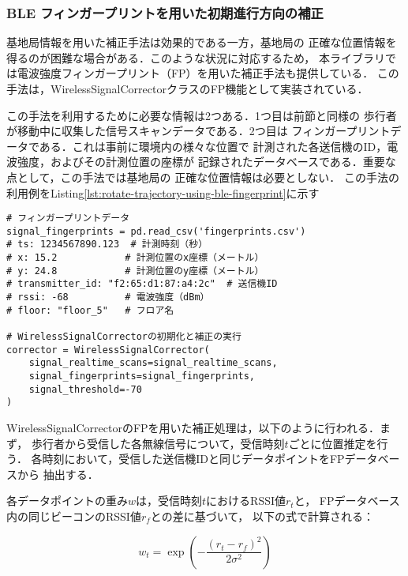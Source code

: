 
\subsubsection{BLE フィンガープリントを用いた初期進行方向の補正}

基地局情報を用いた補正手法は効果的である一方，基地局の
正確な位置情報を得るのが困難な場合がある．このような状況に対応するため，
本ライブラリでは電波強度フィンガープリント（FP）を用いた補正手法も提供している．
この手法は，WirelessSignalCorrectorクラスのFP機能として実装されている．


この手法を利用するために必要な情報は2つある．1つ目は前節と同様の
歩行者が移動中に収集した信号スキャンデータである．2つ目は
フィンガープリントデータである．これは事前に環境内の様々な位置で
計測された各送信機のID，電波強度，およびその計測位置の座標が
記録されたデータベースである．重要な点として，この手法では基地局の
正確な位置情報は必要としない．
この手法の利用例をListing\ref{lst:rotate-trajectory-using-ble-fingerprint}に示す

\begin{lstlisting}[caption={WirelessSignalCorrectorの使用例},label=lst:rotate-trajectory-using-fingerprint,float=ht]
# フィンガープリントデータ
signal_fingerprints = pd.read_csv('fingerprints.csv')
# ts: 1234567890.123  # 計測時刻（秒）
# x: 15.2            # 計測位置のx座標（メートル）
# y: 24.8            # 計測位置のy座標（メートル）
# transmitter_id: "f2:65:d1:87:a4:2c"  # 送信機ID
# rssi: -68          # 電波強度（dBm）
# floor: "floor_5"   # フロア名

# WirelessSignalCorrectorの初期化と補正の実行
corrector = WirelessSignalCorrector(
    signal_realtime_scans=signal_realtime_scans,
    signal_fingerprints=signal_fingerprints,
    signal_threshold=-70
)
\end{lstlisting}

WirelessSignalCorrectorのFPを用いた補正処理は，以下のように行われる．まず，
歩行者から受信した各無線信号について，受信時刻$t$ごとに位置推定を行う．
各時刻において，受信した送信機IDと同じデータポイントをFPデータベースから
抽出する．

各データポイントの重み$w$は，受信時刻$t$におけるRSSI値$r_t$と，
FPデータベース内の同じビーコンのRSSI値$r_f$との差に基づいて，
以下の式で計算される：

\begin{equation}
w_t = \exp\left(-\frac{(r_t - r_f)^2}{2\sigma^2}\right)
\end{equation}

